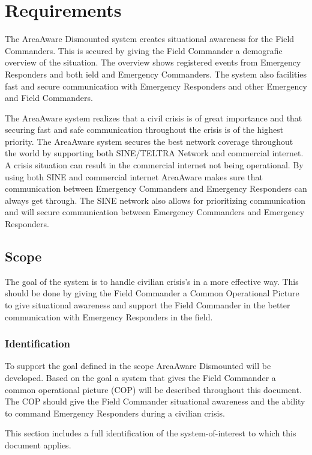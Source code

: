 \label{chp_requirements}
\chapter{Requirements}
The AreaAware Dismounted system creates situational awareness for the Field Commanders. This is secured by giving the Field Commander a demografic overview of the situation. The overview shows registered events from Emergency Responders and both ield and Emergency Commanders. The system also facilities fast and secure communication with Emergency Responders and other Emergency and Field Commanders.

The AreaAware system realizes that a civil crisis is of great importance and that securing fast and safe communication throughout the crisis is of the highest priority. The AreaAware system secures the best network coverage throughout the world by supporting both SINE/TELTRA Network and commercial internet. A crisis situation can result in the commercial internet not being operational. By using both SINE and commercial internet AreaAware makes sure that communication between Emergency Commanders and Emergency Responders can always get through. The SINE network also allows for prioritizing communication and will secure communication between Emergency Commanders and Emergency Responders.

\section{Scope}
The goal of the system is to handle civilian crisis's in a more effective way. This should be done by giving the Field Commander a Common Operational Picture to give situational awareness and support the Field Commander in the better communication with Emergency Responders in the field. 

\subsection{Identification}
To support the goal defined in the scope AreaAware Dismounted will be developed. Based on the goal a system that gives the Field Commander a common operational picture (COP) will be described throughout this document. The COP should give the Field Commander situational awareness and the ability to command Emergency Responders during a civilian crisis. 

This section includes a full identification of the system-of-interest to which this document applies.
\FloatBarrier

